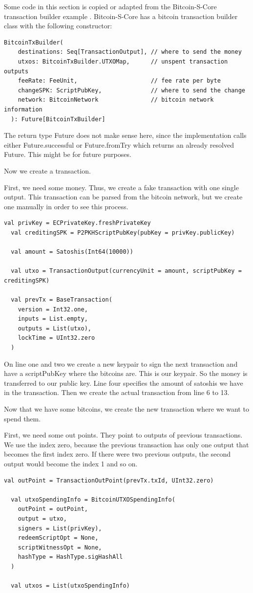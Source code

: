 \documentclass[runningheads]{llncs}
\begin{document}
Some code in this section is copied or adapted from the Bitcoin-S-Core
transaction builder example \cite{BitcoinSCore:txbuilderexample}.
Bitcoin-S-Core has a bitcoin transaction builder class with the
following constructor:
\begin{lstlisting}[style=scala, basicstyle=\scriptsize\tt]
  BitcoinTxBuilder(
    destinations: Seq[TransactionOutput], // where to send the money
    utxos: BitcoinTxBuilder.UTXOMap,      // unspent transaction outputs
    feeRate: FeeUnit,                     // fee rate per byte
    changeSPK: ScriptPubKey,              // where to send the change
    network: BitcoinNetwork               // bitcoin network information
  ): Future[BitcoinTxBuilder]
\end{lstlisting}

The return type Future does not make sense here, since the
implementation calls either Future.successful or Future.fromTry which
returns an already resolved Future.  This might be for future
purposes.

Now we create a transaction.

First, we need some money.  Thus, we create a fake transaction with
one single output.  This transaction can be parsed from the bitcoin
network, but we create one manually in order to see this process.
\begin{lstlisting}[style=scala]
  val privKey = ECPrivateKey.freshPrivateKey
  val creditingSPK = P2PKHScriptPubKey(pubKey = privKey.publicKey)

  val amount = Satoshis(Int64(10000))

  val utxo = TransactionOutput(currencyUnit = amount, scriptPubKey = creditingSPK)

  val prevTx = BaseTransaction(
    version = Int32.one,
    inputs = List.empty,
    outputs = List(utxo),
    lockTime = UInt32.zero
  )
\end{lstlisting}

On line one and two we create a new keypair to sign the next
transaction and have a scriptPubKey where the bitcoins are.  This is
our keypair.  So the money is transferred to our public key.  Line
four specifies the amount of satoshis we have in the transaction.
Then we create the actual transaction from line 6 to 13.

Now that we have some bitcoins, we create the new transaction where we
want to spend them.

First, we need some out points.  They point to outputs of previous
transactions.  We use the index zero, because the previous transaction
has only one output that becomes the first index zero.  If there were
two previous outputs, the second output would become the index 1 and
so on.
\begin{lstlisting}[style=scala]
  val outPoint = TransactionOutPoint(prevTx.txId, UInt32.zero)

  val utxoSpendingInfo = BitcoinUTXOSpendingInfo(
    outPoint = outPoint,
    output = utxo,
    signers = List(privKey),
    redeemScriptOpt = None,
    scriptWitnessOpt = None,
    hashType = HashType.sigHashAll
  )

  val utxos = List(utxoSpendingInfo)
\end{lstlisting}
\end{document}
